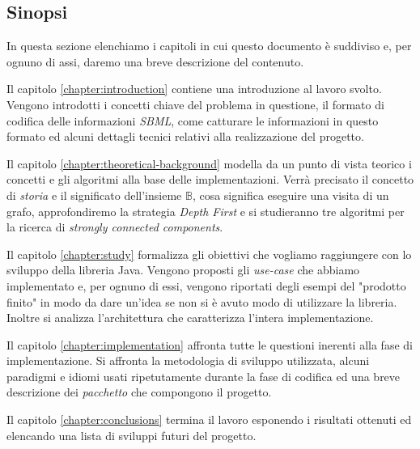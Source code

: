 \subsection{Sinopsi}
In questa sezione elenchiamo i capitoli in cui questo documento \`e
suddiviso e, per ognuno di assi, daremo una breve descrizione del
contenuto.

Il capitolo \ref{chapter:introduction} contiene una introduzione al
lavoro svolto. Vengono introdotti i concetti chiave del problema in
questione, il formato di codifica delle informazioni \emph{SBML}, come
catturare le informazioni in questo formato ed alcuni dettagli tecnici
relativi alla realizzazione del progetto.

Il capitolo \ref{chapter:theoretical-background} modella da un punto
di vista teorico i concetti e gli algoritmi alla base delle
implementazioni. Verr\`a precisato il concetto di \emph{storia} e il
significato dell'insieme $\mathbb{B}$, cosa significa eseguire una
visita di un grafo, approfondiremo la strategia \emph{Depth First} e
si studieranno tre algoritmi per la ricerca di \emph{strongly
  connected components}.

Il capitolo \ref{chapter:study} formalizza gli obiettivi che vogliamo
raggiungere con lo sviluppo della libreria Java. Vengono proposti gli
\emph{use-case} che abbiamo implementato e, per ognuno di essi,
vengono riportati degli esempi del "prodotto finito" in modo da dare
un'idea se non si \`e avuto modo di utilizzare la libreria. Inoltre si
analizza l'architettura che caratterizza l'intera implementazione.

Il capitolo \ref{chapter:implementation} affronta tutte le questioni
inerenti alla fase di implementazione. Si affronta la metodologia di
sviluppo utilizzata, alcuni paradigmi e idiomi usati ripetutamente
durante la fase di codifica ed una breve descrizione dei
\emph{pacchetto} che compongono il progetto.

Il capitolo \ref{chapter:conclusions} termina il lavoro esponendo i
risultati ottenuti ed elencando una lista di sviluppi futuri del
progetto.

